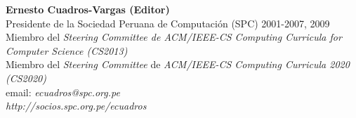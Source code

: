 \textbf{Ernesto Cuadros-Vargas (Editor)}\\ 
Presidente de la Sociedad Peruana de Computación (SPC) 2001-2007, 2009\\
Miembro del \textit{Steering Committee de ACM/IEEE-CS Computing Curricula for Computer Science (CS2013)}\\
Miembro del \textit{Steering Committee} de \textit{ACM/IEEE-CS Computing Curricula 2020 (CS2020)}\\
email: \textit{ecuadros@spc.org.pe}\\
\textit{http://socios.spc.org.pe/ecuadros}
